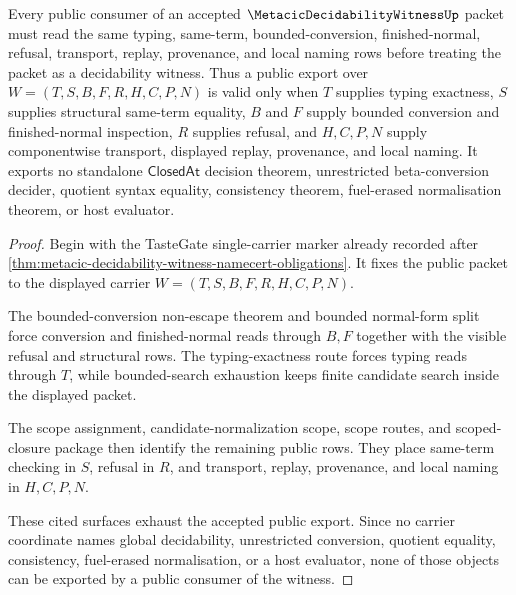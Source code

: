 \begin{theorem}
\label{thm:metacic-decidability-witness-public-export}
Every public consumer of an accepted $\MetacicDecidabilityWitnessUp$ packet must read the same typing, same-term, bounded-conversion, finished-normal, refusal, transport, replay, provenance, and local naming rows before treating the packet as a decidability witness. Thus a public export over $W=(T,S,B,F,R,H,C,P,N)$ is valid only when $T$ supplies typing exactness, $S$ supplies structural same-term equality, $B$ and $F$ supply bounded conversion and finished-normal inspection, $R$ supplies refusal, and $H,C,P,N$ supply componentwise transport, displayed replay, provenance, and local naming. It exports no standalone $\mathsf{ClosedAt}$ decision theorem, unrestricted beta-conversion decider, quotient syntax equality, consistency theorem, fuel-erased normalisation theorem, or host evaluator.
\end{theorem}
\begin{proof}
Begin with the TasteGate single-carrier marker already recorded after \autoref{thm:metacic-decidability-witness-namecert-obligations}. It fixes the public packet to the displayed carrier $W=(T,S,B,F,R,H,C,P,N)$.

The bounded-conversion non-escape theorem and bounded normal-form split force conversion and finished-normal reads through $B,F$ together with the visible refusal and structural rows. The typing-exactness route forces typing reads through $T$, while bounded-search exhaustion keeps finite candidate search inside the displayed packet.

The scope assignment, candidate-normalization scope, scope routes, and scoped-closure package then identify the remaining public rows. They place same-term checking in $S$, refusal in $R$, and transport, replay, provenance, and local naming in $H,C,P,N$.

These cited surfaces exhaust the accepted public export. Since no carrier coordinate names global decidability, unrestricted conversion, quotient equality, consistency, fuel-erased normalisation, or a host evaluator, none of those objects can be exported by a public consumer of the witness.
\end{proof}


